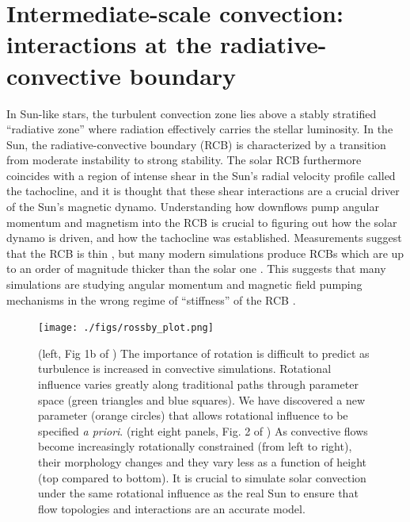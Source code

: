 \documentclass[11pt, preprint]{aastex}
\begin{document}
\section{Intermediate-scale convection: interactions at the radiative-convective boundary}
\vspace{-8pt}
\label{sct:taskB}
In Sun-like stars, the turbulent convection zone lies above a stably stratified ``radiative zone'' where radiation effectively carries the stellar luminosity.
In the Sun, the radiative-convective boundary (RCB) is characterized by a transition from moderate instability to strong stability.
The solar RCB furthermore coincides with a region of intense shear in the Sun's radial velocity profile called the tachocline, and it is thought that these shear interactions are a crucial driver of the Sun's magnetic dynamo.
Understanding how downflows pump angular momentum and magnetism into the RCB is crucial to figuring out how the solar dynamo is driven, and how the tachocline was established.
Measurements suggest that the RCB is thin \citep{basu1997}, but many modern simulations produce RCBs which are up to an order of magnitude thicker than the solar one \citep{hotta2017}.
This suggests that many simulations are studying angular momentum and magnetic field pumping mechanisms in the wrong regime of ``stiffness'' of the RCB \citep{couston&all2017}.

\begin{figure}[t!]
    \texttt{[image: ./figs/rossby\_plot.png]}
    \caption{(left, Fig 1b of \citet{anders&all2019}) The importance of rotation is difficult to predict as turbulence is increased in convective simulations.
	Rotational influence varies greatly along traditional paths through parameter space (green triangles and blue squares).
	We have discovered a new parameter (orange circles) that allows rotational influence to be specified \emph{a priori}.
	(right eight panels, Fig. 2 of \citet{anders&all2019}) As convective flows become increasingly rotationally constrained (from left to right), their morphology changes and they vary less as a function of height (top compared to bottom).
	It is crucial to simulate solar convection under the same rotational influence as the real Sun to ensure that flow topologies and interactions are an accurate model.
	\label{fig:rossby_plot} }
	\vspace{-6pt}
\end{figure}
\end{document}
